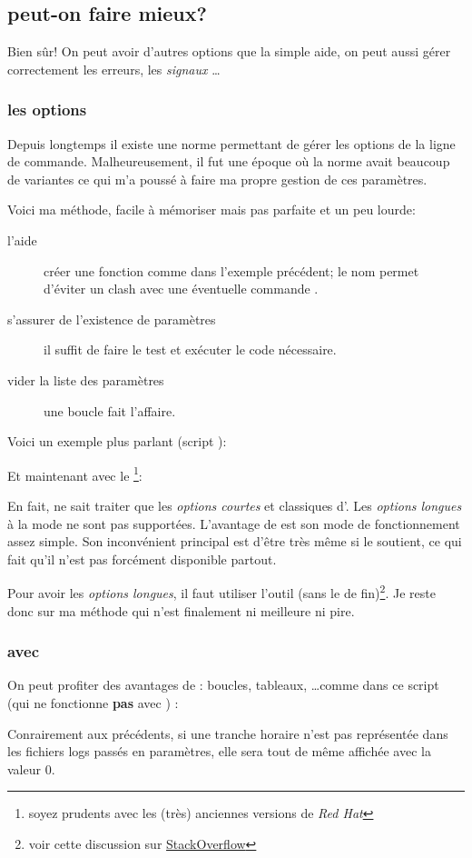 \subsection{peut-on faire mieux?}
Bien sûr! On peut avoir d'autres options que la simple aide, on peut aussi gérer correctement les erreurs, les \emph{signaux \unix}\ldots

\subsubsection{les options}
Depuis longtemps il existe une norme \POSIX{} permettant de gérer les options de la ligne
de commande. Malheureusement, il fut une époque où la norme avait beaucoup de variantes
ce qui m'a poussé à faire ma propre gestion de ces paramètres.

Voici ma méthode, facile à mémoriser mais pas parfaite et un peu lourde:

\begin{description}
    \item[l'aide] créer une fonction  comme dans l'exemple précédent;
    le nom  permet d'éviter un clash avec une éventuelle commande .
    \item[s'assurer de l'existence de paramètres] il suffit de faire le test \code{[ \$\# -eq 0 ]} et
    exécuter le code nécessaire.
    \item[vider la liste des paramètres] une boucle  fait l'affaire.
\end{description}

Voici un exemple plus parlant (script ):


Et maintenant avec le \footnote{soyez prudents avec les (très) anciennes versions de \emph{Red Hat}}:


En fait,  ne sait traiter que les \emph{options courtes} et classiques d'\unix. Les \emph{options longues}
à la mode \linux{} ne sont pas supportées. L'avantage de  est son mode de fonctionnement
assez simple. Son inconvénient principal est d'être très \bash{} même si \POSIX{} le soutient, ce qui fait qu'il
n'est pas forcément disponible partout.

Pour avoir les \emph{options longues}, il faut utiliser l'outil \GNU{}  (sans le  de fin)\footnote{voir cette discussion sur \href{http://stackoverflow.com/questions/402377/using-getopts-in-bash-shell-script-to-get-long-and-short-command-line-options}{StackOverflow}}. 
Je reste donc sur ma méthode qui n'est finalement ni meilleure ni pire.

\subsubsection{avec }
On peut profiter des avantages de \bash : boucles, tableaux, \ldots comme dans ce script (qui ne fonctionne \textbf{pas} avec \sh) :



Conrairement aux précédents, si une tranche horaire n'est pas représentée dans les fichiers logs passés en paramètres, elle sera tout de même affichée avec la valeur 0. 
